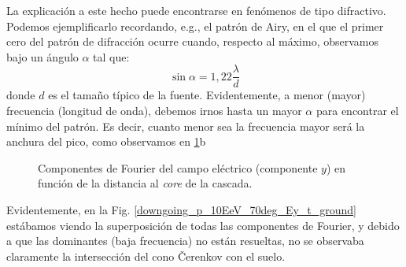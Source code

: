 \documentclass[12 pt, a4paper]{article} %
\numberwithin{equation}{section}
\numberwithin{figure}{section}
\numberwithin{table}{section}
\begin{document}
La explicación a este hecho puede encontrarse en fenómenos de tipo difractivo. Podemos ejemplificarlo recordando, e.g., el patrón de Airy, en el que el primer cero del patrón de difracción ocurre cuando, respecto al máximo, observamos bajo un ángulo $\alpha$ tal que:
\begin{equation}
	\sin\alpha=1,22\frac{\lambda}{d}\label{ec318}
\end{equation}  
donde $d$ es el tamaño típico de la fuente. Evidentemente, a menor (mayor) frecuencia (longitud de onda), debemos irnos hasta un mayor $\alpha$ para encontrar el mínimo del patrón. Es decir, cuanto menor sea la frecuencia mayor será la anchura del pico, como observamos en \ref{freqfieldsgrounds}b
\begin{figure}[H]
	\centering
	\caption{Componentes de Fourier del campo eléctrico (componente $y$) en función de la distancia al \textit{core} de la cascada.}
	\label{freqfieldsgrounds}
\end{figure} 
Evidentemente, en la Fig. \ref{downgoing_p_10EeV_70deg_Ey_t_ground} estábamos viendo la superposición de todas las componentes de Fourier, y debido a que las dominantes (baja frecuencia) no están resueltas, no se observaba claramente la intersección del cono \v{C}erenkov con el suelo.
\end{document}
